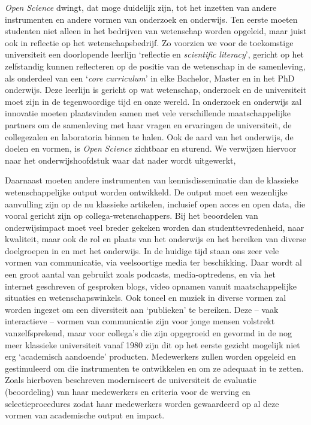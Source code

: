 \documentclass[smallauthor, chapterhaspagenum, nochapterinheader, pagenuminheader,  bigchapnum,medium2, tocpages,  garamond, titleinheader]{jote-book}
\begin{document}
	\emph{Open }\emph{Science} dwingt, dat moge duidelijk zijn, tot het inzetten van andere instrumenten en andere vormen van onderzoek en onderwijs. Ten eerste moeten studenten niet alleen in het bedrijven van wetenschap worden opgeleid, maar juist ook in reflectie op het wetenschapsbedrijf. Zo voorzien we voor de toekomstige universiteit een doorlopende leerlijn ‘reflectie en \emph{scientific}\emph{ }\emph{literacy}', gericht op het zelfstandig kunnen reflecteren op de positie van de wetenschap in de samenleving, als onderdeel van een ‘\emph{core}\emph{ curriculum}' in elke Bachelor, Master en in het PhD onderwijs. Deze leerlijn is gericht op wat wetenschap, onderzoek en de universiteit moet zijn in de tegenwoordige tijd en onze wereld. In onderzoek en onderwijs zal innovatie moeten plaatsvinden samen met vele verschillende maatschappelijke partners om de samenleving met haar vragen en ervaringen de universiteit, de collegezalen en laboratoria binnen te halen. Ook de aard van het onderwijs, de doelen en vormen, is \emph{Open }\emph{Science} zichtbaar en sturend. We verwijzen hiervoor naar het onderwijshoofdstuk waar dat nader wordt uitgewerkt,



	Daarnaast moeten andere instrumenten van kennisdisseminatie dan de klassieke wetenschappelijke output worden ontwikkeld. De output moet een wezenlijke aanvulling zijn op de nu klassieke artikelen, inclusief open acces en open data, die vooral gericht zijn op collega-wetenschappers. Bij het beoordelen van onderwijsimpact moet veel breder gekeken worden dan studenttevredenheid, naar kwaliteit, maar ook de rol en plaats van het onderwijs en het bereiken van diverse doelgroepen in en met het onderwijs. In de huidige tijd staan ons zeer vele vormen van communicatie, via veelsoortige media ter beschikking. Daar wordt al een groot aantal van gebruikt zoals podcasts, media-optredens, en via het internet geschreven of gesproken blogs, video opnamen vanuit maatschappelijke situaties en wetenschapswinkels. Ook toneel en muziek in diverse vormen zal worden ingezet om een diversiteit aan ‘publieken' te bereiken. Deze -- vaak interactieve -- vormen van communicatie zijn voor jonge mensen volstrekt vanzelfsprekend, maar voor collega's die zijn opgegroeid en gevormd in de nog meer klassieke universiteit vanaf 1980 zijn dit op het eerste gezicht mogelijk niet erg ‘academisch aandoende' producten. Medewerkers zullen worden opgeleid en gestimuleerd om die instrumenten te ontwikkelen en om ze adequaat in te zetten. Zoals hierboven beschreven moderniseert de universiteit de evaluatie (beoordeling) van haar medewerkers en criteria voor de werving en selectieprocedures zodat haar medewerkers worden gewaardeerd op al deze vormen van academische output en impact.
\end{document}
